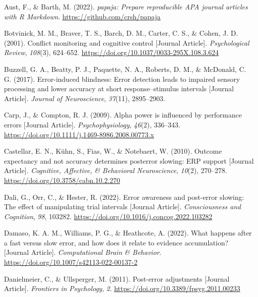 \documentclass[
  man,floatsintext]{apa7}
\newlength{\cslhangindent}
\newlength{\cslentryspacingunit} %
\newenvironment{CSLReferences}[2] %
 {%
  \setlength{\parindent}{0pt}
  \ifodd #1
  \let\oldpar\par
  \def\par{\hangindent=\cslhangindent\oldpar}
  \fi
  \setlength{\parskip}{#2\cslentryspacingunit}
 }%
 {}
\begin{document}
\hypertarget{refs}{}
\begin{CSLReferences}{1}{0}
\leavevmode{}%
Aust, F., \& Barth, M. (2022). \emph{{papaja}: {Prepare} reproducible {APA} journal articles with {R Markdown}}. \url{https://github.com/crsh/papaja}

\leavevmode{}%
Botvinick, M. M., Braver, T. S., Barch, D. M., Carter, C. S., \& Cohen, J. D. (2001). Conflict monitoring and cognitive control {[}Journal Article{]}. \emph{Psychological Review}, \emph{108}(3), 624--652. \url{https://doi.org/10.1037/0033-295X.108.3.624}

\leavevmode{}%
Buzzell, G. A., Beatty, P. J., Paquette, N. A., Roberts, D. M., \& McDonald, C. G. (2017). Error-induced blindness: Error detection leads to impaired sensory processing and lower accuracy at short response--stimulus intervals {[}Journal Article{]}. \emph{Journal of Neuroscience}, \emph{37}(11), 2895--2903.

\leavevmode{}%
Carp, J., \& Compton, R. J. (2009). Alpha power is influenced by performance errors {[}Journal Article{]}. \emph{Psychophysiology}, \emph{46}(2), 336--343. \url{https://doi.org/10.1111/j.1469-8986.2008.00773.x}

\leavevmode{}%
Castellar, E. N., Kühn, S., Fias, W., \& Notebaert, W. (2010). Outcome expectancy and not accuracy determines posterror slowing: ERP support {[}Journal Article{]}. \emph{Cognitive, Affective, \& Behavioral Neuroscience}, \emph{10}(2), 270--278. \url{https://doi.org/10.3758/cabn.10.2.270}

\leavevmode{}%
Dali, G., Orr, C., \& Hester, R. (2022). Error awareness and post-error slowing: The effect of manipulating trial intervals {[}Journal Article{]}. \emph{Consciousness and Cognition}, \emph{98}, 103282. \url{https://doi.org/10.1016/j.concog.2022.103282}

\leavevmode{}%
Damaso, K. A. M., Williams, P. G., \& Heathcote, A. (2022). What happens after a fast versus slow error, and how does it relate to evidence accumulation? {[}Journal Article{]}. \emph{Computational Brain \& Behavior}. \url{https://doi.org/10.1007/s42113-022-00137-2}

\leavevmode{}%
Danielmeier, C., \& Ullsperger, M. (2011). Post-error adjustments {[}Journal Article{]}. \emph{Frontiers in Psychology}, \emph{2}. \url{https://doi.org/10.3389/fpsyg.2011.00233}


\end{CSLReferences}
\end{document}
